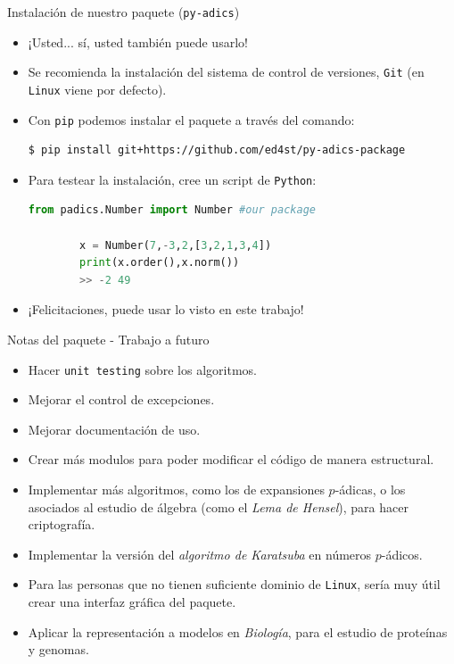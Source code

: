 \documentclass{beamer}
\theoremstyle{definition}
\numberwithin{equation}{section}
\newcommand{\tit}[1]{\textit{#1}}
\begin{document}
\begin{frame}[fragile]{Instalación de nuestro paquete (\texttt{py-adics})}
	\begin{itemize}[<+- | alert@+>]
		\item ¡Usted... sí, usted también puede usarlo!
		\item Se recomienda la instalación del sistema de control de versiones, \texttt{Git} (en \texttt{Linux} viene por defecto).
		\item Con \texttt{pip} podemos instalar el paquete a través del comando:
		\begin{lstlisting}[caption=Terminal o símbolo del sistema,basicstyle=\tiny]
		$ pip install git+https://github.com/ed4st/py-adics-package	
		\end{lstlisting}
		\item Para testear la instalación, cree un script de \texttt{Python}:
		\begin{lstlisting}[language = Python, caption = test del paquete, basicstyle=\tiny]
		from padics.Number import Number #our package
		
		x = Number(7,-3,2,[3,2,1,3,4])
		print(x.order(),x.norm())
		>> -2 49
		\end{lstlisting}
		\item ¡Felicitaciones, puede usar lo visto en este trabajo!
	\end{itemize}
\end{frame}


\begin{frame}{Notas del paquete - Trabajo a futuro}
	\begin{itemize}[<+- | alert@+>]
		\item Hacer \texttt{unit testing} sobre los algoritmos.
		\item Mejorar el control de excepciones.
		\item Mejorar documentación de uso.
		\item Crear más modulos para poder modificar el código de manera estructural.
		\item Implementar más algoritmos, como los de expansiones $p$-ádicas, o los asociados al estudio de álgebra (como el \textit{Lema de Hensel}), para hacer criptografía.
		\item Implementar la versión del \textit{algoritmo de Karatsuba} en números $p$-ádicos.
		\item Para las personas que no tienen suficiente dominio de \texttt{Linux}, sería muy útil crear una interfaz gráfica del paquete.
		\item Aplicar la representación a modelos en \tit{Biología}, para el estudio de proteínas y genomas.
	\end{itemize}
\end{frame}
\end{document}
